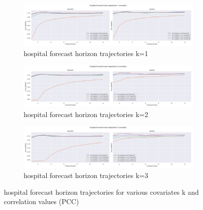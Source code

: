 \documentclass{article}
\begin{document}
\begin{figure}[tbp]
\begin{subfigure}{\textwidth}
\centering
\includegraphics[width=\linewidth]{figures/models_hosp_k1.png}
\caption{hospital forecast horizon trajectories k=1}
\label{fig:base-lstm_seg-lstm_hospital_k_1_trajectory}
\end{subfigure}

\begin{subfigure}{\textwidth}
\centering
\includegraphics[width=\linewidth]{figures/models_hosp_k2.png}
\caption{hospital forecast horizon trajectories k=2}
\label{fig:base-lstm_seg-lstm_hospital_k_2_trajectory}
\end{subfigure}

\begin{subfigure}{\textwidth}
\centering
\includegraphics[width=\linewidth]{figures/models_hosp_k3.png}
\caption{hospital forecast horizon trajectories k=3}
\label{fig:base-lstm_seg-lstm_hospital_k_3_trajectory}
\end{subfigure}
\caption{hospital forecast horizon trajectories for various covariates k and correlation values (PCC)}
\label{fig:base-lstm_seg-lstm_hospital_trajectory}
\end{figure}
\end{document}
